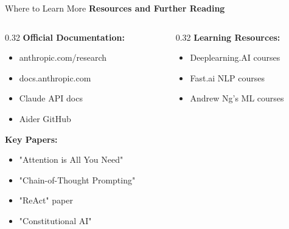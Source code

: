 \documentclass[aspectratio=169,11pt]{beamer}
\begin{document}
\begin{frame}{Where to Learn More}
    \textbf{Resources and Further Reading}

    \begin{columns}[T]
        \begin{column}{0.32\textwidth}
            \textbf{Official Documentation:}
            \begin{itemize}
                \item anthropic.com/research
                \item docs.anthropic.com
                \item Claude API docs
                \item Aider GitHub
            \end{itemize}

            \vspace{0.3cm}
            \textbf{Key Papers:}
            \begin{itemize}
                \item "Attention is All You Need"
                \item "Chain-of-Thought Prompting"
                \item "ReAct" paper
                \item "Constitutional AI"
            \end{itemize}
        \end{column}
        \begin{column}{0.32\textwidth}
            \textbf{Learning Resources:}
            \begin{itemize}
                \item Deeplearning.AI courses
                \item Fast.ai NLP courses
                \item Andrew Ng's ML courses
            \end{itemize}


\end{column}
\end{columns}
\end{frame}
\end{document}
